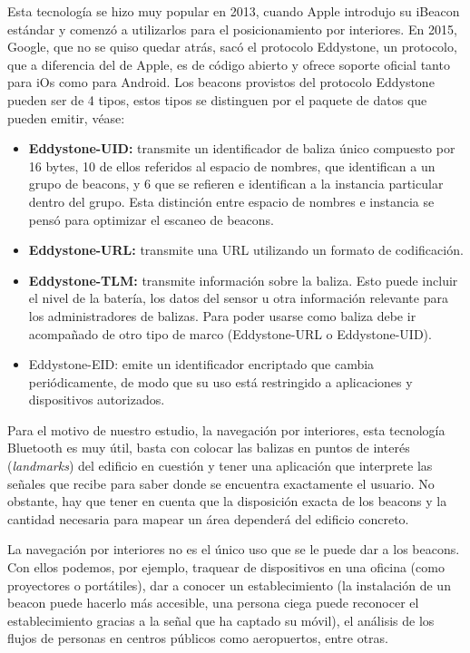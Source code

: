Esta tecnología se hizo muy popular en 2013, cuando Apple introdujo su iBeacon estándar y comenzó a utilizarlos para el posicionamiento por interiores. En 2015, Google, que no se quiso quedar atrás, sacó el protocolo Eddystone, un protocolo, que a diferencia del de Apple, es de código abierto y ofrece soporte oficial tanto para iOs como para Android. Los beacons provistos del protocolo Eddystone pueden ser de 4 tipos, estos tipos se distinguen por el paquete de datos que pueden emitir, véase:



\begin{itemize}
	\item \textbf{Eddystone-UID:} transmite un identificador de baliza único compuesto por 16 bytes, 10 de ellos referidos al espacio de nombres, que identifican a un grupo de beacons, y 6 que se refieren e identifican a la instancia particular dentro del grupo. Esta distinción entre espacio de nombres e instancia se pensó para optimizar el escaneo de beacons.
	\item \textbf{Eddystone-URL:} transmite una URL utilizando un formato de codificación.
	\item \textbf{Eddystone-TLM:} transmite información sobre la baliza. Esto puede incluir el nivel de la batería, los datos del sensor u otra información relevante para los administradores de balizas. Para poder usarse como baliza debe ir acompañado de otro tipo de marco (Eddystone-URL o Eddystone-UID).
	\item Eddystone-EID: emite un identificador encriptado que cambia periódicamente, de modo que su uso está restringido a aplicaciones y dispositivos autorizados.
\end{itemize}

Para el motivo de nuestro estudio, la navegación por interiores, esta tecnología Bluetooth es muy útil, basta con colocar las balizas en puntos de interés (\textit{landmarks}) del edificio en cuestión y tener una aplicación que interprete las señales que recibe para saber donde se encuentra exactamente el usuario. No obstante, hay que tener en cuenta que la disposición exacta de los beacons y la cantidad necesaria para mapear un área dependerá del edificio concreto.

La navegación por interiores no es el único uso que se le puede dar a los beacons. Con ellos podemos, por ejemplo, traquear de dispositivos en una oficina (como proyectores o portátiles), dar a conocer un establecimiento (la instalación de un beacon puede hacerlo más accesible, una persona ciega puede reconocer el establecimiento gracias a la señal que ha captado su móvil), el análisis de los flujos de personas en centros públicos como aeropuertos, entre otras. 

